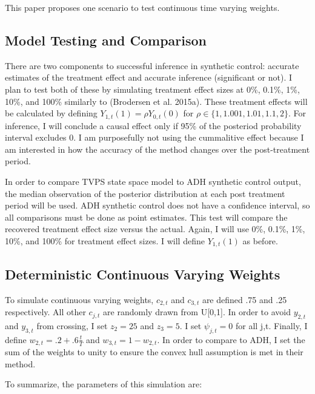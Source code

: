 \documentclass[
]{article}
\begin{document}
This paper proposes one scenario to test continuous time varying
weights.

\hypertarget{model-testing-and-comparison}{%
\subsection{Model Testing and
Comparison}\label{model-testing-and-comparison}}

There are two components to successful inference in synthetic control:
accurate estimates of the treatment effect and accurate inference
(significant or not). I plan to test both of these by simulating
treatment effect sizes at 0\%, 0.1\%, 1\%, 10\%, and 100\% similarly to
(Brodersen et al. 2015a). These treatment effects will be calculated by
defining \(Y_{1,t}(1)=\rho Y_{0,t}(0)\) for
\(\rho \in \{1, 1.001,1.01,1.1,2\}\). For inference, I will conclude a
causal effect only if 95\% of the posteriod probability interval
excludes 0. I am purposefully not using the cummalitive effect because I
am interested in how the accuracy of the method changes over the
post-treatment period.

In order to compare TVPS state space model to ADH synthetic control
output, the median observation of the posterior distribution at each
post treatment period will be used. ADH synthetic control does not have
a confidence interval, so all comparisons must be done as point
estimates. This test will compare the recovered treatment effect size
versus the actual. Again, I will use 0\%, 0.1\%, 1\%, 10\%, and 100\%
for treatment effect sizes. I will define \(Y_{1,t}(1)\) as before.

\hypertarget{deterministic-continuous-varying-weights}{%
\subsection{Deterministic Continuous Varying
Weights}\label{deterministic-continuous-varying-weights}}

To simulate continuous varying weights, \(c_{2,t}\) and \(c_{3,t}\) are
defined .75 and .25 respectively. All other \(c_{j,t}\) are randomly
drawn from U{[}0,1{]}. In order to avoid \(y_{2,t}\) and \(y_{3,t}\)
from crossing, I set \(z_2=25\) and \(z_3=5\). I set \(\psi_{j,t}=0\)
for all j,t. Finally, I define \(w_{2,t}=.2+.6\frac{t}{T}\) and
\(w_{3,t}=1-w_{2,t}\). In order to compare to ADH, I set the sum of the
weights to unity to ensure the convex hull assumption is met in their
method.

To summarize, the parameters of this simulation are:
\end{document}
